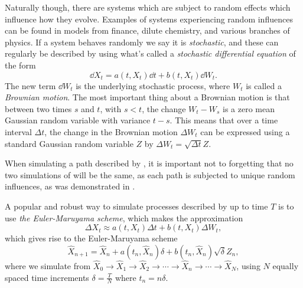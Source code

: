 \documentclass[11pt,a4paper,twoside,english]{extarticle}
\begin{document}
Naturally though, there are systems which are subject to random effects which influence how they evolve. Examples of systems experiencing random influences can be found in models from finance, dilute chemistry, and various branches of physics. If a system behaves randomly we say it is \emph{stochastic}, and these can regularly be described by using what's called a \emph{stochastic differential equation} of the form
\begin{equation}
\dd{X_t}  = a(t, X_t) \dd{t} + b(t, X_t) \dd{W_t}. \label{eqt:sde}
\end{equation}
The new term $ \dd{W_t} $ is the underlying stochastic process, where $ W_t $ is called a \emph{Brownian motion}. The most important thing about a Brownian motion is that between two times $ s $ and $ t $, with $ s < t $, the change $ W_t - W_s $ is a zero mean Gaussian random variable with variance $ t - s $. This means that over a time interval $ \Delta t $, the change in the  Brownian motion $ \Delta W_t $ can be expressed using a standard Gaussian random variable $ Z $ by $ \Delta W_t = \sqrt{\Delta t} Z $.

When simulating a path described by , it is important not to forgetting that no two simulations of  will be the same, as each path is subjected to unique random influences, as was demonstrated in . 

A popular and robust way to simulate processes described by  up to  time $ T $ is to use \emph{the Euler-Maruyama scheme}, which makes the approximation
\begin{equation}
\Delta X_t \approx  a(t, X_t) \Delta t + b(t, X_t) \Delta W_t, \label{eqt:euler_maruyama_approximation}
\end{equation}
which gives rise to the Euler-Maruyama scheme 
\begin{equation}
\hat{X}_{n+1} = \hat{X}_n +  a(t_n, \hat{X}_n) \delta + b(t_n, \hat{X}_n) \sqrt{\delta} Z_n, \label{eqt:euler_maruyama_scheme}
\end{equation}
where we simulate from $ \hat{X}_0 \to \hat{X}_1 \to \hat{X}_2 \to \cdots \to \hat{X}_n \to \cdots \to \hat{X}_N $, using $ N $ equally spaced time increments $ \delta = \tfrac{T}{N}$ where $ t_n = n \delta $. 
\end{document}
